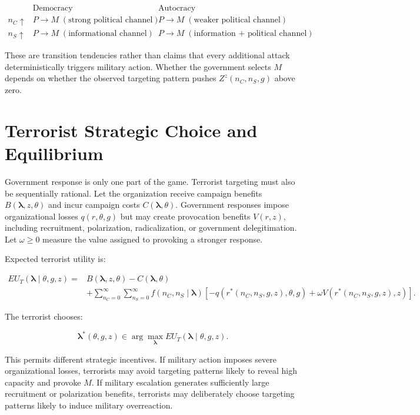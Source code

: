 \documentclass[
  letterpaper,
  DIV=11,
  numbers=noendperiod]{scrartcl}
\begin{document}
\[
\boxed{
\begin{array}{c|cc}
& \text{Democracy} & \text{Autocracy}\\
\hline
n_C\uparrow
& P\rightarrow M\;(\text{strong political channel})
& P\rightarrow M\;(\text{weaker political channel})\\[5pt]
n_S\uparrow
& P\rightarrow M\;(\text{informational channel})
& P\rightarrow M\;(\text{information + political channel})
\end{array}
}
\]

These are transition tendencies rather than claims that every additional
attack deterministically triggers military action. Whether the
government selects \(M\) depends on whether the observed targeting
pattern pushes \(Z^z(n_C,n_S,g)\) above zero.

\section{Terrorist Strategic Choice and
Equilibrium}\label{terrorist-strategic-choice-and-equilibrium}

Government response is only one part of the game. Terrorist targeting
must also be sequentially rational. Let the organization receive
campaign benefits \(B(\boldsymbol{\lambda},z,\theta)\) and incur
campaign costs \(C(\boldsymbol{\lambda},\theta)\). Government responses
impose organizational losses \(q(r,\theta,g)\) but may create
provocation benefits \(V(r,z)\), including recruitment, polarization,
radicalization, or government delegitimation. Let \(\omega\geq0\)
measure the value assigned to provoking a stronger response.

Expected terrorist utility is:

\[
\boxed{
\begin{aligned}
EU_T(\boldsymbol{\lambda}\mid\theta,g,z)
={}&B(\boldsymbol{\lambda},z,\theta)
-C(\boldsymbol{\lambda},\theta)\\
&+\sum_{n_C=0}^{\infty}\sum_{n_S=0}^{\infty}
f(n_C,n_S\mid\boldsymbol{\lambda})
\left[
-q(r^*(n_C,n_S,g,z),\theta,g)
+\omega V(r^*(n_C,n_S,g,z),z)
\right].
\end{aligned}
}
\tag{28}
\]

The terrorist chooses:

\[
\boxed{
\boldsymbol{\lambda}^*(\theta,g,z)
\in
\arg\max_{\boldsymbol{\lambda}}
EU_T(\boldsymbol{\lambda}\mid\theta,g,z).
}
\tag{29}
\]

This permits different strategic incentives. If military action imposes
severe organizational losses, terrorists may avoid targeting patterns
likely to reveal high capacity and provoke \(M\). If military escalation
generates sufficiently large recruitment or polarization benefits,
terrorists may deliberately choose targeting patterns likely to induce
military overreaction.
\end{document}
